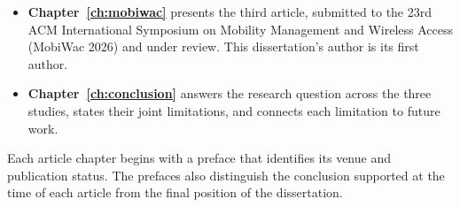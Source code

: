 \begin{itemize}
    \item \textbf{Chapter~\ref{ch:mobiwac}} presents the third article, submitted to the
    23rd ACM International Symposium on Mobility Management and Wireless Access
    (MobiWac 2026) and under review. This dissertation's author is its first
    author.
    \item \textbf{Chapter~\ref{ch:conclusion}} answers the research question across the
    three studies, states their joint limitations, and connects each limitation
    to future work.
\end{itemize}

Each article chapter begins with a preface that identifies its venue and publication
status. The prefaces also distinguish the conclusion supported at the time of each
article from the final position of the dissertation.



